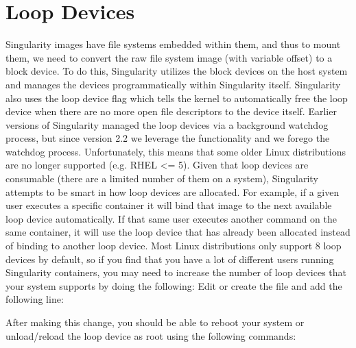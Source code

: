 \documentclass[letterpaper,10pt,english]{sphinxmanual}
\begin{document}
\section{Loop Devices}
\label{\detokenize{the_singularity_config_file:loop-devices}}
Singularity images have  file systems embedded within them, and thus to
mount them, we need to convert the raw file system image (with
variable offset) to a block device. To do this, Singularity utilizes
the  block devices on the host system and manages the devices
programmatically within Singularity itself. Singularity also uses the 
loop device  flag which tells the kernel to automatically free the loop
device when there are no more open file descriptors to the device
itself.
Earlier versions of Singularity managed the loop devices via a
background watchdog process, but since version 2.2 we leverage the 
functionality and we forego the watchdog process. Unfortunately, this
means that some older Linux distributions are no longer supported
(e.g. RHEL \textless{}= 5).
Given that loop devices are consumable (there are a limited number of
them on a system), Singularity attempts to be smart in how loop
devices are allocated. For example, if a given user executes a
specific container it will bind that image to the next available loop
device automatically. If that same user executes another command on
the same container, it will use the loop device that has already been
allocated instead of binding to another loop device. Most Linux
distributions only support 8 loop devices by default, so if you find
that you have a lot of different users running Singularity containers,
you may need to increase the number of loop devices that your system
supports by doing the following:
Edit or create the file  and add the following line:

%
\begin{sphinxVerbatim}[commandchars=\\\{\}]
  
\end{sphinxVerbatim}

After making this change, you should be able to reboot your system or
unload/reload the loop device as root using the following commands:
\end{document}
